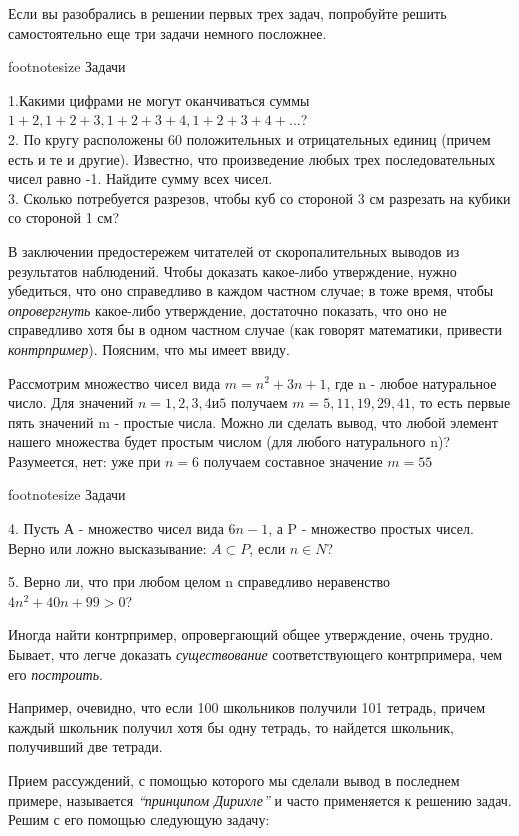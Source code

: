 \documentclass[main.tex]{subfiles}
\begin{document}
\begin{multicols}{2}
Если вы разобрались в решении первых трех задач, попробуйте решить самостоятельно еще три задачи немного посложнее.

{footnotesize  Задачи

 1.Какими цифрами не могут оканчиваться суммы $1 + 2, 1 + 2 + 3, 1 + 2 + 3 + 4, 1 + 2 + 3 + 4 + \dots$?\\
 2. По кругу расположены 60 положительных и отрицательных единиц (причем есть и те и другие). Известно, что произведение любых трех последовательных чисел равно -1. Найдите сумму всех чисел.\\
 3. Сколько потребуется разрезов, чтобы куб со стороной 3 см разрезать на кубики со стороной 1 см?
\par}
 
 В заключении предостережем читателей от скоропалительных выводов из результатов наблюдений. Чтобы доказать какое-либо утверждение, нужно убедиться, что оно справедливо в каждом частном случае; в тоже время, чтобы \textit{опровергнуть} какое-либо утверждение, достаточно показать, что оно не справедливо хотя бы в одном частном случае (как говорят математики, привести \textit{контрпример}). Поясним, что мы имеет ввиду.
 
 Рассмотрим множество чисел вида $m = n^{2} + 3n + 1$, где n - любое натуральное число. Для значений $n = 1, 2 , 3, 4 и 5$ получаем $m = 5, 11, 19, 29, 41$, то есть первые пять значений m - простые числа. Можно ли сделать вывод, что любой элемент нашего множества будет простым числом (для любого натурального n)? Разумеется, нет: уже при $n = 6$ получаем составное значение $m = 55$
 
{footnotesize  Задачи

 4. Пусть А - множество чисел вида $6n - 1$, а P - множество простых чисел. Верно или ложно высказывание: $A \subset P$, если $n \in N$?

 5. Верно ли, что при любом целом n справедливо неравенство $4n^{2} + 40n + 99 > 0$?
 \par}
 
 Иногда найти контрпример, опровергающий общее утверждение, очень трудно. Бывает, что легче доказать \textit{существование} соответствующего контрпримера, чем его \textit{построить}.
 
 Например, очевидно, что если 100 школьников получили 101 тетрадь, причем каждый школьник получил хотя бы одну тетрадь, то найдется школьник, получивший две тетради.
 
Прием рассуждений, с помощью которого мы сделали вывод в последнем примере, называется \textit{``принципом Дирихле''} и часто применяется к решению задач. Решим с его помощью следующую задачу:


\end{multicols}
\end{document}
